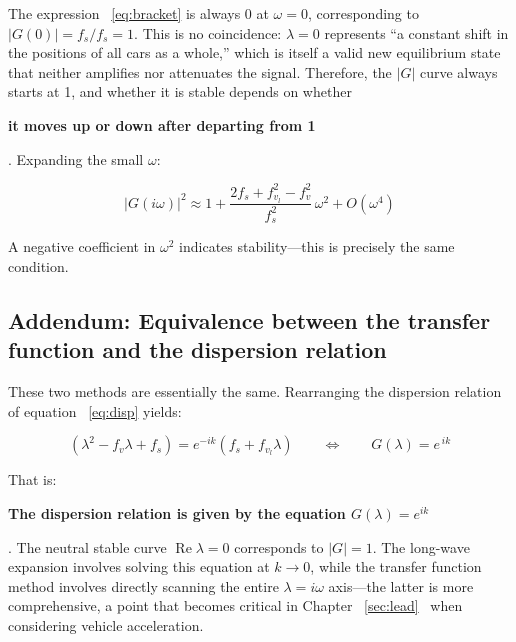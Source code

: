 \documentclass[11pt,a4paper,openany]{book}
\numberwithin{equation}{chapter}
\numberwithin{figure}{chapter}
\numberwithin{table}{chapter}
\begin{document}
\begin{tcolorbox}[notebox,title=\textbf{Why is the equality sign always used at $\omega=0$}]

The expression ~\eqref{eq:bracket} is always 0 at $\omega=0$, corresponding to $\left|G(0)\right| = f_s/f_s = 1$. This is no coincidence: $\lambda=0$ represents “a constant shift in the positions of all cars as a whole,” which is itself a valid new equilibrium state that neither amplifies nor attenuates the signal. Therefore, the $\left|G\right|$ curve always starts at 1, and whether it is stable depends on whether




\textbf{it moves up or down after departing from 1}




. Expanding the small $\omega$:

\[
\left|G(i\omega)\right|^2 \approx 1 + \frac{2f_s + f_{v_l}^2 - f_v^2}{f_s^2}\,\omega^2 + O(\omega^4)
\]

A negative coefficient in $\omega^2$ indicates stability—this is precisely the same condition.







\end{tcolorbox}

\subsection{Addendum: Equivalence between the transfer function and the dispersion relation}





These two methods are essentially the same. Rearranging the dispersion relation of equation ~\eqref{eq:disp} yields:

\begin{equation}
\left(\lambda^2 - f_v\lambda + f_s\right) = e^{-ik}\left(f_s + f_{v_l}\lambda\right)
\qquad\Longleftrightarrow\qquad
G(\lambda) = e^{\,ik}
\end{equation}




That is:




\textbf{The dispersion relation is given by the equation $G(\lambda)=e^{ik}$
}




. The neutral stable curve $\operatorname{Re}\lambda=0$ corresponds to $\left|G\right|=1$. The long-wave expansion involves solving this equation at $k\to0$, while the transfer function method involves directly scanning the entire $\lambda=i\omega$ axis—the latter is more comprehensive, a point that becomes critical in Chapter ~\ref{sec:lead}~ when considering vehicle acceleration.
\end{document}
